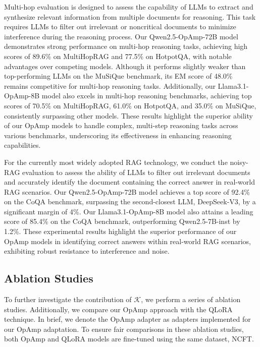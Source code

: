 Multi-hop evaluation is designed to assess the capability of LLMs to extract and synthesize relevant information from multiple documents for reasoning. 
This task requires LLMs to filter out irrelevant or noncritical documents to minimize interference during the reasoning process.
Our Qwen2.5-OpAmp-72B model demonstrates strong performance on multi-hop reasoning tasks, achieving high scores of 89.6\% on MultiHopRAG and 77.5\% on HotpotQA, with notable advantages over competing models. 
Although it performs slightly weaker than top-performing LLMs on the MuSiQue benchmark, its EM score of 48.0\% remains competitive for multi-hop reasoning tasks. 
Additionally, our Llama3.1-OpAmp-8B model also excels in multi-hop reasoning benchmarks, achieving top scores of 70.5\% on MultiHopRAG, 61.0\% on HotpotQA, and 35.0\% on MuSiQue, consistently surpassing other models. 
These results highlight the superior ability of our OpAmp models to handle complex, multi-step reasoning tasks across various benchmarks, underscoring its effectiveness in enhancing reasoning capabilities.

For the currently most widely adopted RAG technology, we conduct the noisy-RAG evaluation to assess the ability of LLMs to filter out irrelevant documents and accurately identify the document containing the correct answer in real-world RAG scenarios.
Our Qwen2.5-OpAmp-72B model achieves a top score of 92.4\% on the CoQA benchmark, surpassing the second-closest LLM, DeepSeek-V3, by a significant margin of 4\%. 
Our Llama3.1-OpAmp-8B model also attains a leading score of 85.4\% on the CoQA benchmark, outperforming Qwen2.5-7B-inst by 1.2\%. 
These experimental results highlight the superior performance of our OpAmp models in identifying correct answers within real-world RAG scenarios, exhibiting robust resistance to interference and noise.

\subsection{Ablation Studies}
\label{sec:ab}

To further investigate the contribution of $\mathcal{K}$, we perform a series of ablation studies. 
Additionally, we compare our OpAmp approach with the QLoRA technique. 
In brief, we denote the OpAmp adapter as adapters implemented for our OpAmp adaptation.
To ensure fair comparisons in these ablation studies, both OpAmp and QLoRA models are fine-tuned using the same dataset, NCFT.

